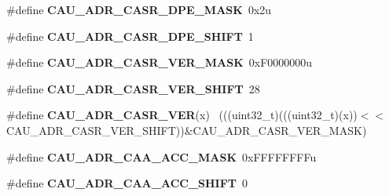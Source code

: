 \begin{DoxyCompactItemize}
\item 
\hypertarget{group___c_a_u___register___masks_gac2aa12b2fd1060e7b5c444cb64efbcf6}{}\#define {\bfseries C\+A\+U\+\_\+\+A\+D\+R\+\_\+\+C\+A\+S\+R\+\_\+\+D\+P\+E\+\_\+\+M\+A\+S\+K}~0x2u\label{group___c_a_u___register___masks_gac2aa12b2fd1060e7b5c444cb64efbcf6}

\item 
\hypertarget{group___c_a_u___register___masks_gac342820577edd24d5b9b2ffe7279c18a}{}\#define {\bfseries C\+A\+U\+\_\+\+A\+D\+R\+\_\+\+C\+A\+S\+R\+\_\+\+D\+P\+E\+\_\+\+S\+H\+I\+F\+T}~1\label{group___c_a_u___register___masks_gac342820577edd24d5b9b2ffe7279c18a}

\item 
\hypertarget{group___c_a_u___register___masks_gabb62168b08dff77e1dd30ca4cb6cd997}{}\#define {\bfseries C\+A\+U\+\_\+\+A\+D\+R\+\_\+\+C\+A\+S\+R\+\_\+\+V\+E\+R\+\_\+\+M\+A\+S\+K}~0x\+F0000000u\label{group___c_a_u___register___masks_gabb62168b08dff77e1dd30ca4cb6cd997}

\item 
\hypertarget{group___c_a_u___register___masks_ga22dcce65fce4ef3511615cbd4d1a0e1e}{}\#define {\bfseries C\+A\+U\+\_\+\+A\+D\+R\+\_\+\+C\+A\+S\+R\+\_\+\+V\+E\+R\+\_\+\+S\+H\+I\+F\+T}~28\label{group___c_a_u___register___masks_ga22dcce65fce4ef3511615cbd4d1a0e1e}

\item 
\hypertarget{group___c_a_u___register___masks_gaef511c7f965e971768bf588c9b7a4891}{}\#define {\bfseries C\+A\+U\+\_\+\+A\+D\+R\+\_\+\+C\+A\+S\+R\+\_\+\+V\+E\+R}(x)                                        ~(((uint32\+\_\+t)(((uint32\+\_\+t)(x))$<$$<$C\+A\+U\+\_\+\+A\+D\+R\+\_\+\+C\+A\+S\+R\+\_\+\+V\+E\+R\+\_\+\+S\+H\+I\+F\+T))\&C\+A\+U\+\_\+\+A\+D\+R\+\_\+\+C\+A\+S\+R\+\_\+\+V\+E\+R\+\_\+\+M\+A\+S\+K)\label{group___c_a_u___register___masks_gaef511c7f965e971768bf588c9b7a4891}

\item 
\hypertarget{group___c_a_u___register___masks_gacc0c6924fefc7cc98506f9c0d031d9b4}{}\#define {\bfseries C\+A\+U\+\_\+\+A\+D\+R\+\_\+\+C\+A\+A\+\_\+\+A\+C\+C\+\_\+\+M\+A\+S\+K}~0x\+F\+F\+F\+F\+F\+F\+F\+Fu\label{group___c_a_u___register___masks_gacc0c6924fefc7cc98506f9c0d031d9b4}

\item 
\hypertarget{group___c_a_u___register___masks_gaf629b44286a47b9d05d74250f509747a}{}\#define {\bfseries C\+A\+U\+\_\+\+A\+D\+R\+\_\+\+C\+A\+A\+\_\+\+A\+C\+C\+\_\+\+S\+H\+I\+F\+T}~0\label{group___c_a_u___register___masks_gaf629b44286a47b9d05d74250f509747a}


\end{DoxyCompactItemize}
